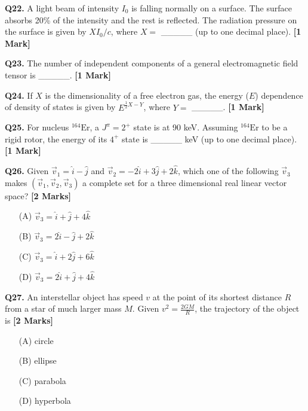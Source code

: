 \documentclass[11pt]{article}
\newcommand{\questiona}[2]{
    \noindent\textbf{Q#2.} #1 \hfill \textbf{[1 Mark]}
}
\newcommand{\questionb}[2]{
    \noindent\textbf{Q#2.} #1 \hfill \textbf{[2 Marks]}
}
\begin{document}
\questiona{A light beam of intensity \(I_0\) is falling normally on a surface. The surface absorbs 20\% of the intensity and the rest is reflected. The radiation pressure on the surface is given by \(X I_0 / c\), where \(X =\) \_\_\_\_\_ (up to one decimal place).}{22}
\vspace{0.5cm}

\questiona{The number of independent components of a general electromagnetic field tensor is \_\_\_\_\_.}{23}
\vspace{0.5cm}

\questiona{If \(X\) is the dimensionality of a free electron gas, the energy (\(E\)) dependence of density of states is given by \(E^{\frac{1}{2}X - Y}\), where \(Y =\) \_\_\_\_\_.}{24}
\vspace{0.5cm}

\questiona{For nucleus \({}^{164}\text{Er}\), a \(J^\pi = 2^+\) state is at 90 keV. Assuming \({}^{164}\text{Er}\) to be a rigid rotor, the energy of its \(4^+\) state is \_\_\_\_\_ keV (up to one decimal place).}{25}
\vspace{0.5cm}

\questionb{Given \(\vec{v}_1 = \hat{i} - \hat{j}\) and \(\vec{v}_2 = -2\hat{i} + 3\hat{j} + 2\hat{k}\), which one of the following \(\vec{v}_3\) makes \((\vec{v}_1, \vec{v}_2, \vec{v}_3)\) a complete set for a three dimensional real linear vector space?}{26}
\begin{enumerate}
    \item[(A)] \(\vec{v}_3 = \hat{i} + \hat{j} + 4\hat{k}\)  
    \item[(B)] \(\vec{v}_3 = 2\hat{i} - \hat{j} + 2\hat{k}\)  
    \item[(C)] \(\vec{v}_3 = \hat{i} + 2\hat{j} + 6\hat{k}\)  
    \item[(D)] \(\vec{v}_3 = 2\hat{i} + \hat{j} + 4\hat{k}\)  
\end{enumerate}
\vspace{0.5cm}

\questionb{An interstellar object has speed \(v\) at the point of its shortest distance \(R\) from a star of much larger mass \(M\). Given \(v^2 = \frac{2GM}{R}\), the trajectory of the object is}{27}
\begin{enumerate}
    \item[(A)] circle  
    \item[(B)] ellipse  
    \item[(C)] parabola  
    \item[(D)] hyperbola  
\end{enumerate}
\vspace{0.5cm}
\end{document}
